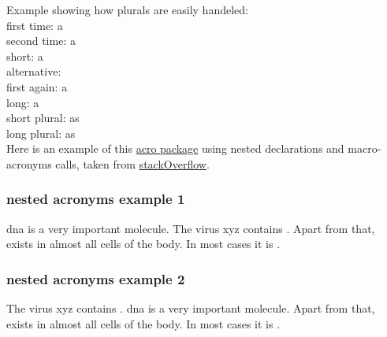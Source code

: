 %

Example showing how plurals are easily handeled:
\\
first time: \ac{a} \\
second time: \ac{a} \\
short: \acs{a} \\
alternative:  \\
first again: \acf{a} \\
long: \acl{a} \\
short plural: \acsp{a} \\
long plural: \aclp{a} \\

Here is an example of this \href{}{acro package}
using nested declarations and macro-acronyms calls, taken from
\href{http://tex.stackexchange.com/questions/135975/how-to-define-an-acronym-by-using-other-acronym-and-print-the-abbreviations-toge}{stackOverflow}.

\subsubsection*{nested acronyms example 1}

\Ac{dna} is a very important molecule.  The virus xyz contains \dsdna.  Apart
from that, \dna exists in almost all cells of the body. In most cases it is
\dsdna.

\subsubsection*{nested acronyms example 2}
\acresetall

The virus xyz contains \dsdna.  \Ac{dna} is a very important molecule.  Apart
from that, \dna exists in almost all cells of the body. In most cases it is
\dsdna.
